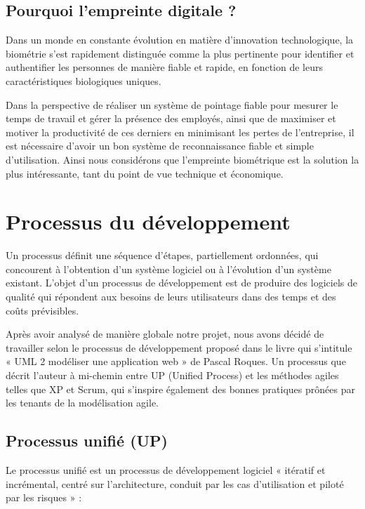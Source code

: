         \subsection{Pourquoi l’empreinte digitale ?}
            Dans un monde en constante évolution en matière d’innovation technologique, la biométrie s’est rapidement distinguée comme la plus pertinente pour identifier et authentifier les personnes de manière fiable et rapide, en fonction de leurs caractéristiques biologiques uniques.

            Dans la perspective de réaliser un système de pointage fiable pour mesurer le temps de travail et gérer la présence des employés, ainsi que de maximiser et motiver la productivité de ces derniers en minimisant les pertes de l’entreprise, il est nécessaire d’avoir un bon système de reconnaissance fiable et simple d’utilisation. Ainsi nous considérons que l’empreinte biométrique est la solution la plus intéressante, tant du point de vue technique et économique. 

\section{Processus du développement}
Un processus définit une séquence d’étapes, partiellement ordonnées, qui concourent à l’obtention d’un système logiciel ou à l’évolution d’un système existant. L’objet d’un processus de développement est de produire des logiciels de qualité qui répondent aux besoins de leurs utilisateurs dans des temps et des coûts prévisibles. \cite{5}

Après avoir analysé de manière globale notre projet, nous avons décidé de travailler selon le processus de développement proposé dans le livre qui s’intitule « UML 2 modéliser une application web » de Pascal Roques. Un processus que décrit l’auteur à mi-chemin entre UP (Unified Process) et les méthodes agiles telles que XP et Scrum, qui s’inspire également des bonnes pratiques prônées par les tenants de la modélisation agile.
    \subsection{Processus unifié (UP)}
        Le processus unifié est un processus de développement logiciel « itératif et incrémental, centré sur l’architecture, conduit par les cas d’utilisation et piloté par les risques » :
    
